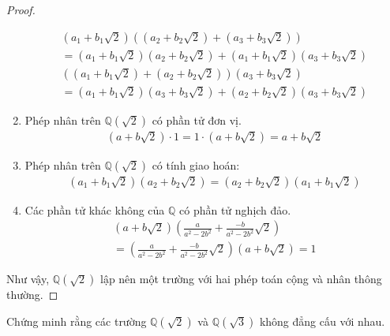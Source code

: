 \documentclass[class=linearalgebra,crop=false]{standalone}
\begin{document}
\begin{proof}
\begin{enumerate}[label = (\roman*)]
        \begin{gather*}
            (a_{1} + b_{1}\sqrt{2})((a_{2} + b_{2}\sqrt{2}) + (a_{3} + b_{3}\sqrt{2})) \\
            = (a_{1} + b_{1}\sqrt{2})(a_{2} + b_{2}\sqrt{2}) + (a_{1} + b_{1}\sqrt{2})(a_{3} + b_{3}\sqrt{2})
        \end{gather*}
        \begin{gather*}
            ((a_{1} + b_{1}\sqrt{2}) + (a_{2} + b_{2}\sqrt{2}))(a_{3} + b_{3}\sqrt{2}) \\
            = (a_{1} + b_{1}\sqrt{2})(a_{3} + b_{3}\sqrt{2}) + (a_{2} + b_{2}\sqrt{2})(a_{3} + b_{3}\sqrt{2})
        \end{gather*}
        \item Phép nhân trên $\mathbb{Q}(\sqrt{2})$ có phần tử đơn vị.
        \begin{gather*}
            (a + b\sqrt{2})\cdot 1 = 1\cdot (a + b\sqrt{2}) = a + b\sqrt{2}
        \end{gather*}
        \item Phép nhân trên $\mathbb{Q}(\sqrt{2})$ có tính giao hoán:
        \begin{gather*}
            (a_{1} + b_{1}\sqrt{2})(a_{2} + b_{2}\sqrt{2}) = (a_{2} + b_{2}\sqrt{2})(a_{1} + b_{1}\sqrt{2})
        \end{gather*}
        \item Các phần tử khác không của $\mathbb{Q}$ có phần tử nghịch đảo.
        \begin{gather*}
            (a + b\sqrt{2})\left(\frac{a}{a^{2} - 2b^{2}} + \frac{-b}{a^{2}-2b^{2}}\sqrt{2}\right) \\
            =\left(\frac{a}{a^{2} - 2b^{2}} + \frac{-b}{a^{2}-2b^{2}}\sqrt{2}\right)(a + b\sqrt{2}) = 1
        \end{gather*}
    \end{enumerate}
    \par Như vậy, $\mathbb{Q}(\sqrt{2})$ lập nên một trường với hai phép toán cộng và nhân thông thường.
\end{proof}

\begin{exercise}Chứng minh rằng các trường $\mathbb{Q}(\sqrt{2})$ và $\mathbb{Q}(\sqrt{3})$ không đẳng cấu với nhau.
\end{exercise}
\end{document}
